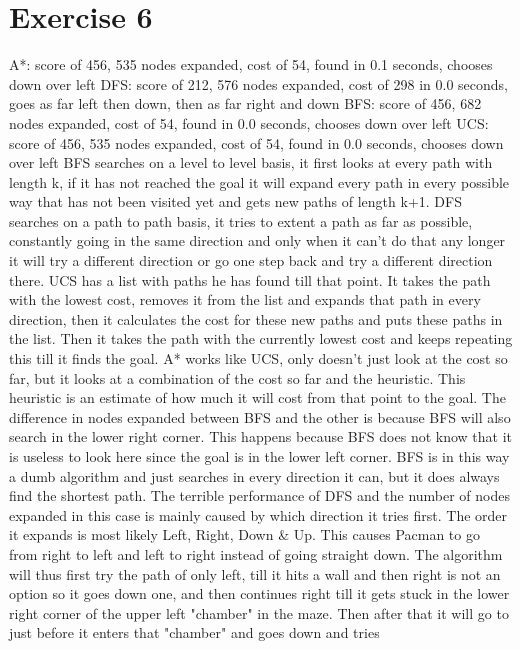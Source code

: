 \section{Exercise 6}
A*:  score of 456, 535 nodes expanded, cost of 54, found in 0.1 seconds, chooses down over left
DFS: score of 212, 576 nodes expanded, cost of 298 in 0.0 seconds, goes as far left then down, then as far right and down
BFS: score of 456, 682 nodes expanded, cost of 54, found in 0.0 seconds, chooses down over left
UCS: score of 456, 535 nodes expanded, cost of 54, found in 0.0 seconds, chooses down over left
BFS searches on a level to level basis, it first looks at every path with length k, if it has not reached the goal 
it will expand every path in every possible way that has not been visited yet and gets new paths of length k+1.
DFS searches on a path to path basis, it tries to extent a path as far as possible, constantly going in the same direction
and only when it can't do that any longer it will try a different direction or go one step back and try a different direction there.
UCS has a list with paths he has found till that point. It takes the path with the lowest cost, removes it from the list 
and expands that path in every direction, then it calculates the cost for these new paths and puts these paths in the list. 
Then it takes the path with the currently lowest cost and keeps repeating this till it finds the goal.
A* works like UCS, only doesn't just look at the cost so far, but it looks at a combination of the cost so far and the heuristic.
This heuristic is an estimate of how much it will cost from that point to the goal.
The difference in nodes expanded between BFS and the other is because BFS will also search in the lower right corner. 
This happens because BFS does not know that it is useless to look here since the goal is in the lower left corner.
BFS is in this way a dumb algorithm and just searches in every direction it can, but it does always find the shortest path.
The terrible performance of DFS and the number of nodes expanded in this case is mainly caused by which direction it tries first. 
The order it expands is most likely Left, Right, Down & Up. This causes Pacman to go from right to left and left to right
instead of going straight down. The algorithm will thus first try the path of only left, till it hits a wall and then right 
is not an option so it goes down one, and then continues right till it gets stuck in the lower right corner of the upper left "chamber"
in the maze. Then after that it will go to just before it enters that "chamber" and goes down and tries 
